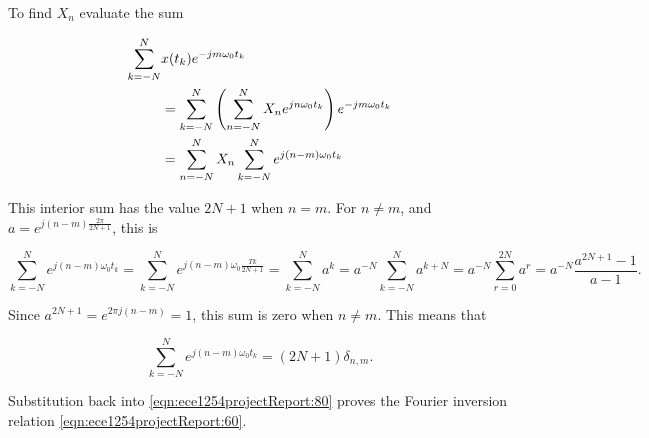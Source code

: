 \appendices

\label{appendix:discreteFourierInversion}

To find \( X_n \) evaluate the sum

\begin{equation}\label{eqn:ece1254projectReport:80}
\begin{aligned}
\sum_{k = -N}^N &x(t_k) e^{-j m \omega_0 t_k} \\
&=
\sum_{k = -N}^N
\lr{
\sum_{n = -N}^N X_n e^{ j n \omega_0 t_k}
}
e^{-j m \omega_0 t_k} \\
&=
\sum_{n = -N}^N X_n
\sum_{k = -N}^N
e^{ j (n -m )\omega_0 t_k}
\end{aligned}
\end{equation}

This interior sum has the value \( 2 N + 1 \) when \( n = m \).
For \( n \ne m \), and
\( a = e^{j (n -m ) \frac{2 \pi}{2 N + 1}} \), this is

\begin{dmath}\label{eqn:ece1254projectReport:100}
\sum_{k = -N}^N
e^{ j (n -m )\omega_0 t_k}
=
\sum_{k = -N}^N
e^{ j (n -m )\omega_0 \frac{T k}{2 N + 1}}
=
\sum_{k = -N}^N a^k
=
a^{-N} \sum_{k = -N}^N a^{k+ N}
=
a^{-N} \sum_{r = 0}^{2 N} a^{r}
=
a^{-N} \frac{a^{2 N + 1} - 1}{a - 1}.
\end{dmath}

Since \( a^{2 N + 1} = e^{2 \pi j (n - m)} = 1 \), this sum is zero when \( n \ne m \).
This means that

\begin{equation}\label{eqn:ece1254projectReport:120}
\sum_{k = -N}^N
e^{ j (n -m )\omega_0 t_k} = (2 N + 1) \delta_{n,m}.
\end{equation}

Substitution back into \cref{eqn:ece1254projectReport:80} proves the Fourier inversion relation \cref{eqn:ece1254projectReport:60}.

